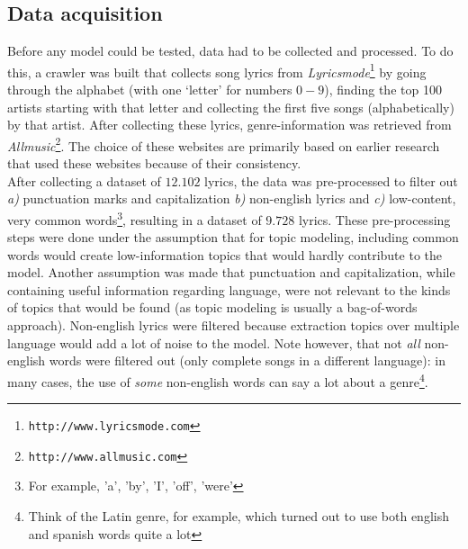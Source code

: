 \subsection{Data acquisition}
Before any model could be tested, data had to be collected and processed. To do this, a crawler was built that collects song lyrics from \textit{Lyricsmode}\footnote{\texttt{http://www.lyricsmode.com}} by going through the alphabet (with one `letter' for numbers $0-9$), finding the top 100 artists starting with that letter and collecting the first five songs (alphabetically) by that artist. After collecting these lyrics, genre-information was retrieved from \textit{Allmusic}\footnote{\texttt{http://www.allmusic.com}}. The choice of these websites are primarily based on earlier research \cite{felllyrics} that used these websites because of their consistency. \\
After collecting a dataset of $12.102$ lyrics, the data was pre-processed to filter out \textit{a)} punctuation marks and capitalization \textit{b)} non-english lyrics and \textit{c)} low-content, very common words\footnote{For example, 'a', 'by', 'I', 'off', 'were'}, resulting in a dataset of $9.728$ lyrics. These pre-processing steps were done under the assumption that for topic modeling, including common words would create low-information topics that would hardly contribute to the model. Another assumption was made that punctuation and capitalization, while containing useful information regarding language, were not relevant to the kinds of topics that would be found (as topic modeling is usually a bag-of-words approach). Non-english lyrics were filtered because extraction topics over multiple language would add a lot of noise to the model. Note however, that not \textit{all} non-english words were filtered out (only complete songs in a different language): in many cases, the use of \textit{some} non-english words can say a lot about a genre\footnote{Think of the Latin genre, for example, which turned out to use both english and spanish words quite a lot}. 




